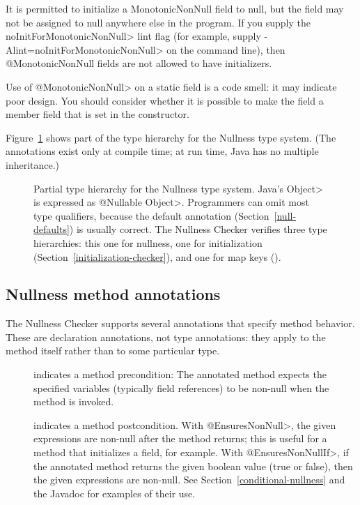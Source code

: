 \begin{description}
  It is permitted to initialize a MonotonicNonNull field to null, but the
  field may not be assigned to null anywhere else in the program.  If you
  supply the \<noInitForMonotonicNonNull> lint flag (for example, supply
  \<-Alint=noInitForMonotonicNonNull> on the command line), then
  @MonotonicNonNull fields are not allowed to have initializers.

  Use of \<@MonotonicNonNull> on a static field is a code smell:  it may
  indicate poor design.  You should consider whether it is possible to make
  the field a member field that is set in the constructor.

\end{description}

Figure~\ref{fig-nullness-hierarchy} shows part of the type hierarchy for the
Nullness type system.
(The annotations exist only at compile time; at run time, Java has no
multiple inheritance.)

\begin{figure}
\caption{Partial type hierarchy for the Nullness type system.
Java's \<Object> is expressed as \<@Nullable Object>.  Programmers can omit
most type qualifiers, because the default annotation
(Section~\ref{null-defaults}) is usually correct.
The Nullness Checker verifies three type hierarchies:  this one for
nullness, one for initialization (Section~\ref{initialization-checker}),
and one for map keys ().}
\label{fig-nullness-hierarchy}
\end{figure}


\subsection{Nullness method annotations\label{nullness-method-annotations}}

The Nullness Checker supports several annotations that specify method
behavior.  These are declaration annotations, not type annotations:  they
apply to the method itself rather than to some particular type.

\begin{description}

\item[]
  indicates a method precondition:  The annotated method expects the
  specified variables (typically field references) to be non-null when the
  method is invoked.

\item[]
\item[]
  indicates a method postcondition.  With \<@EnsuresNonNull>, the given
  expressions are non-null after the method returns; this is useful for a
  method that initializes a field, for example.  With
  \<@EnsuresNonNullIf>, if the annotated
  method returns the given boolean value (true or false), then the given
  expressions are non-null.  See Section~\ref{conditional-nullness} and the
  Javadoc for examples of their use.

\end{description}


